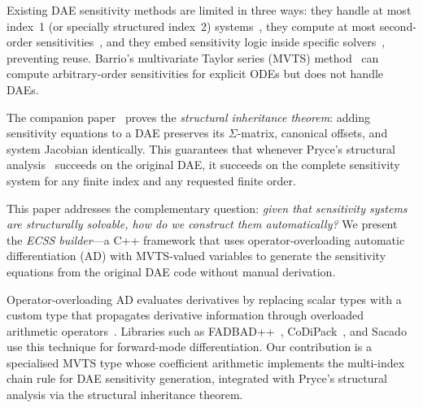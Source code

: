 \documentclass[12pt,a4paper]{article}
\theoremstyle{definition}
\theoremstyle{plain}
\theoremstyle{remark}
\begin{document}
Existing DAE sensitivity methods are limited in three ways: they handle at most index~1 (or specially structured index~2) systems~\cite{li2000sensitivity,cao2002adjoint,cao2003adjoint}, they compute at most second-order sensitivities~\cite{barrio2006sensitivity}, and they embed sensitivity logic inside specific solvers~\cite{gardner2022sundials}, preventing reuse. Barrio's multivariate Taylor series (MVTS) method~\cite{barrio2006sensitivity} can compute arbitrary-order sensitivities for explicit ODEs but does not handle DAEs.

The companion paper~\cite{cao2026structural} proves the \emph{structural inheritance theorem}: adding sensitivity equations to a DAE preserves its $\Sigma$-matrix, canonical offsets, and system Jacobian identically. This guarantees that whenever Pryce's structural analysis~\cite{pryce2001simple} succeeds on the original DAE, it succeeds on the complete sensitivity system for any finite index and any requested finite order.

This paper addresses the complementary question: \emph{given that sensitivity systems are structurally solvable, how do we construct them automatically?} We present the \emph{ECSS builder}---a C++ framework that uses operator-overloading automatic differentiation (AD) with MVTS-valued variables to generate the sensitivity equations from the original DAE code without manual derivation.

Operator-overloading AD evaluates derivatives by replacing scalar types with a custom type that propagates derivative information through overloaded arithmetic operators~\cite{griewank2008evaluating}. Libraries such as FADBAD++~\cite{bendtsen1996fadbad}, CoDiPack~\cite{sagebaum2019codipack}, and Sacado~\cite{phipps2012sacado} use this technique for forward-mode differentiation. Our contribution is a specialised MVTS type whose coefficient arithmetic implements the multi-index chain rule for DAE sensitivity generation, integrated with Pryce's structural analysis via the structural inheritance theorem.
\end{document}
